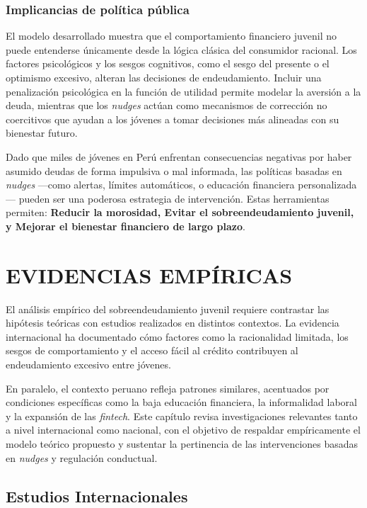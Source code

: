 \documentclass[10pt]{article}
\begin{document}
\begin{multicols}{2}
\subsubsection*{Implicancias de política pública}

El modelo desarrollado muestra que el comportamiento financiero juvenil no puede entenderse únicamente desde la lógica clásica del consumidor racional. Los factores psicológicos y los sesgos cognitivos, como el sesgo del presente o el optimismo excesivo, alteran las decisiones de endeudamiento. Incluir una penalización psicológica en la función de utilidad permite modelar la aversión a la deuda, mientras que los \textit{nudges} actúan como mecanismos de corrección no coercitivos que ayudan a los jóvenes a tomar decisiones más alineadas con su bienestar futuro.

Dado que miles de jóvenes en Perú enfrentan consecuencias negativas por haber asumido deudas de forma impulsiva o mal informada, las políticas basadas en \textit{nudges} —como alertas, límites automáticos, o educación financiera personalizada— pueden ser una poderosa estrategia de intervención. Estas herramientas permiten: \textbf{Reducir la morosidad, Evitar el sobreendeudamiento juvenil, y Mejorar el bienestar financiero de largo plazo}.


\section{EVIDENCIAS EMPÍRICAS}

El análisis empírico del sobreendeudamiento juvenil requiere contrastar las hipótesis teóricas con estudios realizados en distintos contextos. La evidencia internacional ha documentado cómo factores como la racionalidad limitada, los sesgos de comportamiento y el acceso fácil al crédito contribuyen al endeudamiento excesivo entre jóvenes.

En paralelo, el contexto peruano refleja patrones similares, acentuados por condiciones específicas como la baja educación financiera, la informalidad laboral y la expansión de las \textit{fintech}. Este capítulo revisa investigaciones relevantes tanto a nivel internacional como nacional, con el objetivo de respaldar empíricamente el modelo teórico propuesto y sustentar la pertinencia de las intervenciones basadas en \textit{nudges} y regulación conductual.

\subsection{Estudios Internacionales}


\end{multicols}
\end{document}
